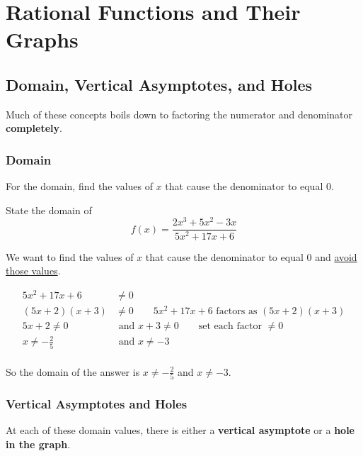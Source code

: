 \chapter{Rational Functions and Their Graphs}

\section{Domain, Vertical Asymptotes, and Holes}

Much of these concepts boils down to factoring the numerator and denominator \textbf{completely}.

\subsection*{Domain}

For the domain, find the values of $x$ that cause the denominator to equal 0. \\

\begin{example} 
State the domain of
\[
f(x) = \frac{2x^3 + 5x^2 - 3x}{5x^2 + 17x + 6}
\]
\end{example}

\begin{solution}
We want to find the values of $x$ that cause the denominator to equal 0 and \underline{avoid those values}.

\begin{align*}
    5x^2 + 17x + 6 &\neq 0  \\
    (5x + 2)(x + 3) &\neq 0 \qquad 5x^2 + 17x + 6 \text{ factors as } (5x+2)(x+3) \\
    5x + 2 \neq 0 &\text{ and } x + 3 \neq 0 \qquad \text{set each factor } \neq 0 \\
    x \neq -\tfrac{2}{5} &\text{ and } x \neq -3 \\
\end{align*}

So the domain of the answer is $x \neq -\tfrac{2}{5}$ and $x \neq -3$.
\end{solution}

\subsection*{Vertical Asymptotes and Holes}

At each of these domain values, there is either a {\color{red}\textbf{vertical asymptote}} or a {\color{red}\textbf{hole in the graph}}.    \\

